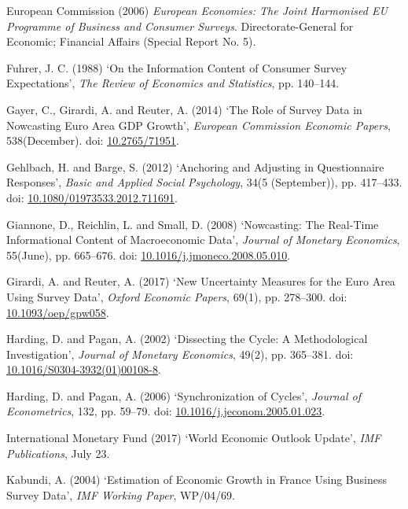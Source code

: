 \documentclass[11pt,]{article}
\begin{document}
\hypertarget{ref-EC2006}{}
European Commission (2006) \emph{European Economies: The Joint
Harmonised EU Programme of Business and Consumer Surveys}.
Directorate-General for Economic; Financial Affairs (Special Report No.
5).

\hypertarget{ref-Fuhrer1988}{}
Fuhrer, J. C. (1988) `On the Information Content of Consumer Survey
Expectations', \emph{The Review of Economics and Statistics}, pp.
140--144.

\hypertarget{ref-Gayer2014}{}
Gayer, C., Girardi, A. and Reuter, A. (2014) `The Role of Survey Data in
Nowcasting Euro Area GDP Growth', \emph{European Commission Economic
Papers}, 538(December). doi:
\href{https://doi.org/10.2765/71951}{10.2765/71951}.

\hypertarget{ref-Gehlbach2012}{}
Gehlbach, H. and Barge, S. (2012) `Anchoring and Adjusting in
Questionnaire Responses', \emph{Basic and Applied Social Psychology},
34(5 (September)), pp. 417--433. doi:
\href{https://doi.org/10.1080/01973533.2012.711691}{10.1080/01973533.2012.711691}.

\hypertarget{ref-Giannone2008}{}
Giannone, D., Reichlin, L. and Small, D. (2008) `Nowcasting: The
Real-Time Informational Content of Macroeconomic Data', \emph{Journal of
Monetary Economics}, 55(June), pp. 665--676. doi:
\href{https://doi.org/10.1016/j.jmoneco.2008.05.010}{10.1016/j.jmoneco.2008.05.010}.

\hypertarget{ref-Girardi2017}{}
Girardi, A. and Reuter, A. (2017) `New Uncertainty Measures for the Euro
Area Using Survey Data', \emph{Oxford Economic Papers}, 69(1), pp.
278--300. doi:
\href{https://doi.org/10.1093/oep/gpw058}{10.1093/oep/gpw058}.

\hypertarget{ref-Harding2002}{}
Harding, D. and Pagan, A. (2002) `Dissecting the Cycle: A Methodological
Investigation', \emph{Journal of Monetary Economics}, 49(2), pp.
365--381. doi:
\href{https://doi.org/10.1016/S0304-3932(01)00108-8}{10.1016/S0304-3932(01)00108-8}.

\hypertarget{ref-Harding2006}{}
Harding, D. and Pagan, A. (2006) `Synchronization of Cycles',
\emph{Journal of Econometrics}, 132, pp. 59--79. doi:
\href{https://doi.org/10.1016/j.jeconom.2005.01.023}{10.1016/j.jeconom.2005.01.023}.

\hypertarget{ref-IMF2017}{}
International Monetary Fund (2017) `World Economic Outlook Update',
\emph{IMF Publications}, July 23.

\hypertarget{ref-Kabundi2004}{}
Kabundi, A. (2004) `Estimation of Economic Growth in France Using
Business Survey Data', \emph{IMF Working Paper}, WP/04/69.
\end{document}

